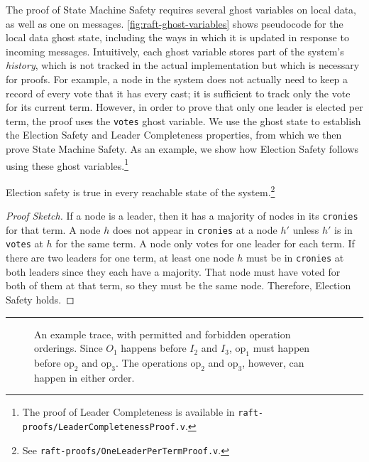 The proof of State Machine Safety requires several ghost variables on
local data, as well as one on messages. \cref{fig:raft-ghost-variables} shows
pseudocode for the local data ghost state, including the ways in which
it is updated in response to incoming messages. Intuitively, each
ghost variable stores part of the system's \textit{history}, which is
not tracked in the actual implementation but which is necessary for
proofs. For example, a node in the system does not actually need to
keep a record of every vote that it has every cast; it is sufficient
to track only the vote for its current term. However, in order to
prove that only one leader is elected per term, the proof uses the
\texttt{votes} ghost variable.  We use the ghost state to establish
the Election Safety and Leader Completeness properties, from which we
then prove State Machine Safety. As an example, we show how Election
Safety follows using these ghost variables.\footnote{The proof of Leader
Completeness is available in \texttt{raft-proofs/\allowbreak LeaderCompletenessProof.v}.}

\begin{theorem}
  Election safety is true in every reachable state of the
  system.\footnote{See \texttt{raft-proofs/OneLeaderPerTermProof.v}.}
\end{theorem}
\begin{proof}[Proof Sketch]
  If a node is a leader, then it has a majority of nodes in its
  \texttt{cronies} for that term. A node $h$ does not appear in
  \texttt{cronies} at a node $h'$ unless $h'$ is in \texttt{votes} at
  $h$ for the same term. A node only votes for one leader for each
  term. If there are two leaders for one term, at least one node $h$
  must be in \texttt{cronies} at both leaders since they each have a
  majority. That node must have voted for both of them at that term,
  so they must be the same node. Therefore, Election Safety holds.
\end{proof}

\hrule{}

\begin{figure}[t]
  \centering
  

  \caption{An example trace, with permitted and forbidden operation
    orderings. Since $O_1$ happens before $I_2$ and $I_3$,
    $\mathrm{op}_1$ must happen before $\mathrm{op}_2$ and
    $\mathrm{op}_3$. The operations $\mathrm{op}_2$ and
    $\mathrm{op}_3$, however, can happen in either order.}

\label{fig:linearizability-diagram}
\end{figure}


